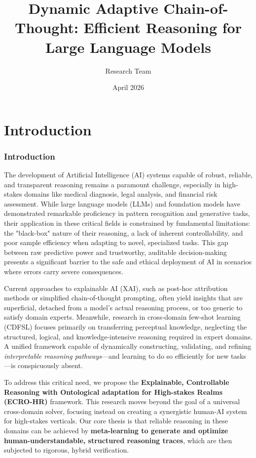 \documentclass[11pt,a4paper]{article}
\title{Dynamic Adaptive Chain-of-Thought: Efficient Reasoning for Large Language Models}
\author{Research Team}
\date{April 2026}
\begin{document}
\maketitle

\begin{abstract}

\end{abstract}

\section{Introduction}

\subsubsection{\textbf{Introduction}}

The development of Artificial Intelligence (AI) systems capable of robust, reliable, and transparent reasoning remains a paramount challenge, especially in high-stakes domains like medical diagnosis, legal analysis, and financial risk assessment. While large language models (LLMs) and foundation models have demonstrated remarkable proficiency in pattern recognition and generative tasks, their application in these critical fields is constrained by fundamental limitations: the "black-box" nature of their reasoning, a lack of inherent controllability, and poor sample efficiency when adapting to novel, specialized tasks. This gap between raw predictive power and trustworthy, auditable decision-making presents a significant barrier to the safe and ethical deployment of AI in scenarios where errors carry severe consequences.

Current approaches to explainable AI (XAI), such as post-hoc attribution methods or simplified chain-of-thought prompting, often yield insights that are superficial, detached from a model's actual reasoning process, or too generic to satisfy domain experts. Meanwhile, research in cross-domain few-shot learning (CDFSL) focuses primarily on transferring perceptual knowledge, neglecting the structured, logical, and knowledge-intensive reasoning required in expert domains. A unified framework capable of dynamically constructing, validating, and refining \textit{interpretable reasoning pathways}—and learning to do so efficiently for new tasks—is conspicuously absent.

To address this critical need, we propose the \textbf{Explainable, Controllable Reasoning with Ontological adaptation for High-stakes Realms (ECRO-HR)} framework. This research moves beyond the goal of a universal cross-domain solver, focusing instead on creating a synergistic human-AI system for high-stakes verticals. Our core thesis is that reliable reasoning in these domains can be achieved by \textbf{meta-learning to generate and optimize human-understandable, structured reasoning traces}, which are then subjected to rigorous, hybrid verification.
\end{document}
